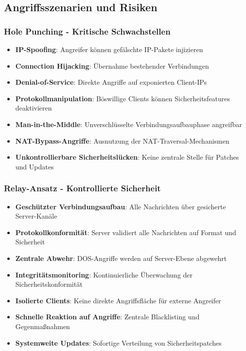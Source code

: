 \documentclass[10pt,a4paper]{article}
\begin{document}
\subsection{Angriffsszenarien und Risiken}

\subsubsection{Hole Punching - Kritische Schwachstellen}
\begin{itemize}[left=0pt]
\item \textbf{IP-Spoofing}: Angreifer können gefälschte IP-Pakete injizieren
\item \textbf{Connection Hijacking}: Übernahme bestehender Verbindungen
\item \textbf{Denial-of-Service}: Direkte Angriffe auf exponierten Client-IPs
\item \textbf{Protokollmanipulation}: Böswillige Clients können Sicherheitsfeatures deaktivieren
\item \textbf{Man-in-the-Middle}: Unverschlüsselte Verbindungsaufbauphase angreifbar
\item \textbf{NAT-Bypass-Angriffe}: Ausnutzung der NAT-Traversal-Mechanismen
\item \textbf{Unkontrollierbare Sicherheitslücken}: Keine zentrale Stelle für Patches und Updates
\end{itemize}

\subsubsection{Relay-Ansatz - Kontrollierte Sicherheit}
\begin{itemize}[left=0pt]
\item \textbf{Geschützter Verbindungsaufbau}: Alle Nachrichten über gesicherte Server-Kanäle
\item \textbf{Protokollkonformität}: Server validiert alle Nachrichten auf Format und Sicherheit
\item \textbf{Zentrale Abwehr}: DOS-Angriffe werden auf Server-Ebene abgewehrt
\item \textbf{Integritätsmonitoring}: Kontinuierliche Überwachung der Sicherheitskonformität
\item \textbf{Isolierte Clients}: Keine direkte Angriffsfläche für externe Angreifer
\item \textbf{Schnelle Reaktion auf Angriffe}: Zentrale Blacklisting und Gegenmaßnahmen
\item \textbf{Systemweite Updates}: Sofortige Verteilung von Sicherheitspatches
\end{itemize}
\end{document}
